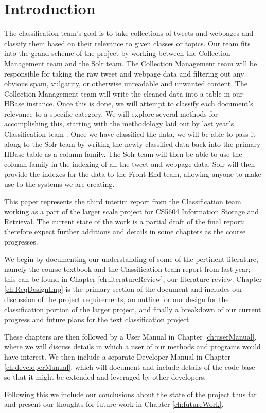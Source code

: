 \chapter{Introduction}\label{ch:introduction}

The classification team’s goal is to take collections of tweets and webpages and classify them based on their relevance to given classes or topics. Our team fits into the grand scheme of the project by working between the Collection Management team and the Solr team. The Collection Management team will be responsible for taking the raw tweet and webpage data and filtering out any obvious spam, vulgarity, or otherwise unreadable and unwanted content. The Collection Management team will write the cleaned data into a table in our HBase instance. Once this is done, we will attempt to classify each document's relevance to a specific category. We will explore several methods for accomplishing this, starting with the methodology laid out by last year's Classification team \cite{cui2015classification}. Once we have classified the data, we will be able to pass it along to the Solr team by writing the newly classified data back into the primary HBase table as a column family. The Solr team will then be able to use the column family in the indexing of all the tweet and webpage data. Solr will then provide the indexes for the data to the Front End team, allowing anyone to make use to the systems we are creating.

This paper represents the third interim report from the Classification team working as a part of the larger scale project for CS5604 Information Storage and Retrieval. The current state of the work is a partial draft of the final report; therefore expect further additions and details in some chapters as the course progresses.

We begin by documenting our understanding of some of the pertinent literature, namely the course textbook and the Classification team report from last year; this can be found in Chapter \ref{ch:literatureReview}, our literature review. Chapter \ref{ch:ReqDesignImp} is the primary section of the document and includes our discussion of the project requirements, an outline for our design for the classification portion of the larger project, and finally a breakdown of our current progress and future plans for the text classification project.

These chapters are then followed by a User Manual in Chapter \ref{ch:userManual}, where we will discuss details in which a user of our methods and programs would have interest. We then include a separate Developer Manual in Chapter \ref{ch:developerManual}, which will document and include details of the code base so that it might be extended and leveraged by other developers.

Following this we include our conclusions about the state of the project thus far and present our thoughts for future work in Chapter \ref{ch:futureWork}.
